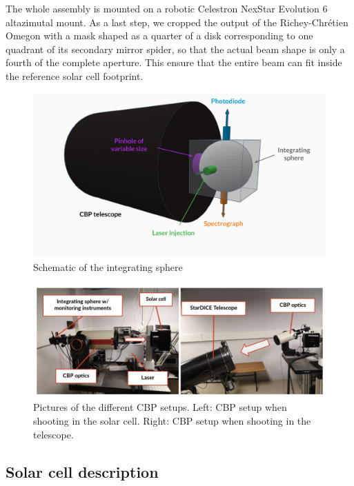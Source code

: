The whole assembly is mounted on a robotic Celestron NexStar Evolution 6
altazimutal mount. As a last step, we cropped the output of the Richey-Chrétien
Omegon with a mask shaped as a quarter of a disk corresponding to one
quadrant of its secondary mirror spider, so that the actual beam shape
is only a fourth of the complete aperture. This ensure that the entire
beam can fit inside the reference solar cell footprint.

\begin{figure}
    \centering
    \includegraphics[width=1\columnwidth]{fig/integrating_sphere_3d.pdf}
    \caption{Schematic of the integrating sphere}
    \label{fig:sphere}
\end{figure}

\begin{figure}[ht]
\centering
\includegraphics[width=\textwidth]{fig/cbp_setup_cropped.pdf}
\caption{Pictures of the different CBP setups. Left: CBP setup when shooting in the solar cell. Right: CBP setup when shooting in the \SD telescope.}
\label{fig:cbp_setup}
\end{figure}

\subsection{Solar cell description}

